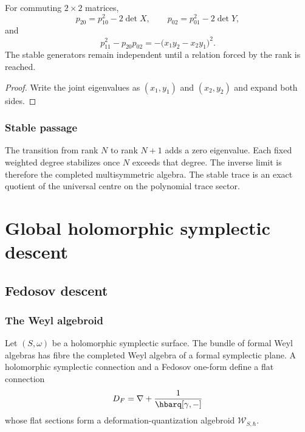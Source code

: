\begin{proposition}
For commuting $2\times2$ matrices,
\[
 p_{20}=p_{10}^2-2\det X,
 \qquad
 p_{02}=p_{01}^2-2\det Y,
\]
and
\[
 p_{11}^2-p_{20}p_{02}
 =-\bigl(x_1y_2-x_2y_1\bigr)^2.
\]
The stable generators remain independent until a relation forced by the rank is reached.
\end{proposition}
\begin{proof}
Write the joint eigenvalues as $(x_1,y_1)$ and $(x_2,y_2)$ and expand both sides.
\end{proof}

\section{Stable passage}
The transition from rank $N$ to rank $N+1$ adds a zero eigenvalue.  Each fixed weighted degree stabilizes once $N$ exceeds that degree.  The inverse limit is therefore the completed multisymmetric algebra.  The stable trace is an exact quotient of the universal centre on the polynomial trace sector.


\part{Global holomorphic symplectic descent}

\chapter{Fedosov descent}
\section{The Weyl algebroid}
Let $(S,\omega)$ be a holomorphic symplectic surface.  The bundle of formal Weyl algebras has fibre the completed Weyl algebra of a formal symplectic plane.  A holomorphic symplectic connection and a Fedosov one-form define a flat connection
\[
 D_F=\nabla+\frac1\hbarq[\gamma,-]
\]
whose flat sections form a deformation-quantization algebroid $\mathcal W_{S,\hbar}$.

